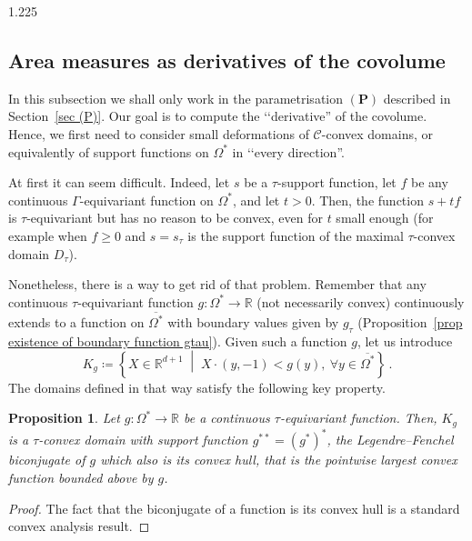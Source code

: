 \documentclass[reqno, a4paper]{amsart}
\numberwithin{equation}{section}
\numberwithin{figure}{section}
\newtheorem{proposition}[theorem]{Proposition}
\theoremstyle{definition}
\theoremstyle{remark}
\newcommand{\R}{\mathbb{R}} %
\newcommand{\C}{\mathcal{C}} %
\newcommand{\st}{\; \middle\vert \;} %
\begin{document}
\begin{spacing}{1.225}
\subsection{Area measures as derivatives of the covolume}

In this subsection we shall only work in the parametrisation $(\mathbf{P})$ described in Section~\ref{sec (P)}. Our goal is to compute the ‘‘derivative'' of the covolume. Hence, we first need to consider small deformations of $\C$-convex domains, or equivalently of support functions on $\Omega^*$ in ‘‘every direction''.

At first it can seem difficult. Indeed, let $s$ be a $\tau$-support function, let $f$ be any continuous $\Gamma$-equivariant function on $\Omega^*$, and let $t>0$. Then, the function $s+tf$ is $\tau$-equivariant but has no reason to be convex, even for $t$ small enough (for example when $f\geq 0$ and $s = s_\tau$ is the support function of the maximal $\tau$-convex domain $D_\tau$). 

Nonetheless, there is a way to get rid of that problem. Remember that any continuous $\tau$-equivariant function $g: \Omega^* \to \R$ (not necessarily convex) continuously extends to a function on $\overline{\Omega^*}$ with boundary values given by $g_\tau$ (Proposition~\ref{prop existence of boundary function gtau}). Given such a function $g$, let us introduce
 \begin{equation*}
 K_g \coloneqq \left\lbrace X \in \R^{d+1} \st X\cdot(y,-1)<g(y), \ \forall y \in \overline{\Omega^*}\right\rbrace \, . 
 \end{equation*}
The domains defined in that way satisfy the following key property.

\begin{proposition}
\label{prop Kg and g**}
Let $g: \Omega^* \to \R$ be a continuous $\tau$-equivariant function. Then, $K_g$ is a $\tau$-convex domain with support function $g^{**} = (g^*)^*$, the \emph{Legendre--Fenchel biconjugate} of $g$ which also is its \emph{convex hull}, that is the pointwise largest convex function bounded above by $g$. 
\end{proposition}
\begin{proof}
The fact that the biconjugate of a function is its convex hull is a standard convex analysis result. 


\end{proof}
\end{spacing}
\end{document}
